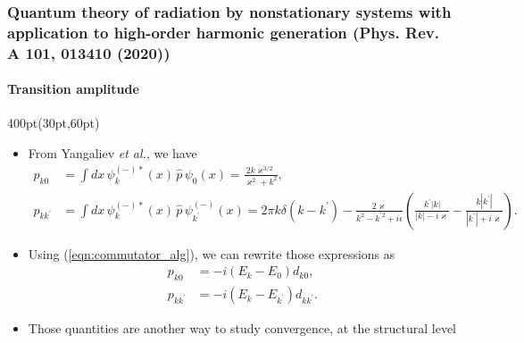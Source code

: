 \begin{frame}
\frametitle{Quantum theory of radiation by nonstationary systems 
        with application to high-order harmonic generation
        (Phys. Rev. A 101, 013410 (2020))}
        \framesubtitle{Transition amplitude}



\begin{textblock*}{400pt}(30pt,60pt)
\begin{itemize}
\footnotesize
\item From Yangaliev \textit{et al.}, we have 
\begin{align}
p_{k0} & = \int dx\,\psi_k^{(-)*}(x)\,\hat{p}\, \psi_0(x)
        =  \frac{2k\varkappa^{3/2}}{\varkappa^2 + k^2}, \\
p_{kk^\prime} & = \int dx\, \psi_k^{(-)*}(x)\,\hat{p}\,\psi_{k^\prime}^{(-)}(x)
        = 2\pi k \delta(k-k^\prime)
 - \frac{2\varkappa}{k^2 - k^{\prime2} + i\epsilon}
 \left( \frac{k^\prime|k|}{|k|-i\varkappa} 
       - \frac{k|k^\prime|}{|k^\prime|+i\varkappa}\right) .
\end{align}

\item  Using (\ref{eqn:commutator_alg}), we can rewrite those expressions as
\begin{align}
p_{k0}        & =  - i\left( E_k - E_0 \right)d_{k0}, \\
p_{kk^\prime} & =  - i\left( E_k - E_{k^\prime} \right)d_{kk^\prime}.
\end{align}
		\vspace{10pt}
\item Those quantities are another way to study convergence, 
	at the structural level
\end{itemize}
\end{textblock*}


\end{frame}




